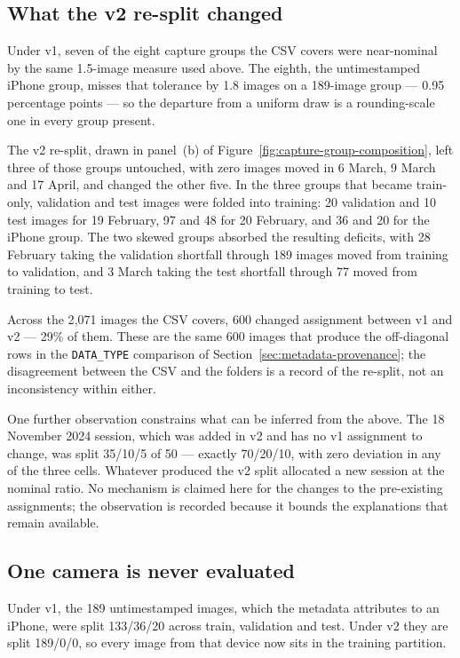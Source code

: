 \subsection{What the v2 re-split changed}
\label{sec:v2-resplit}

Under v1, seven of the eight capture groups the CSV covers were near-nominal by
the same 1.5-image measure used above. The eighth, the untimestamped iPhone
group, misses that tolerance by 1.8 images on a 189-image group --- 0.95
percentage points --- so the departure from a uniform draw is a rounding-scale
one in every group present.

The v2 re-split, drawn in panel~(b) of
Figure~\ref{fig:capture-group-composition}, left three of those groups untouched,
with zero images moved in 6 March, 9 March and 17 April, and changed the other
five. In the three groups that
became train-only, validation and test images were folded into training: 20
validation and 10 test images for 19 February, 97 and 48 for 20 February, and 36
and 20 for the iPhone group. The two skewed groups absorbed the resulting
deficits, with 28 February taking the validation shortfall through 189 images
moved from training to validation, and 3 March taking the test shortfall through
77 moved from training to test.

Across the 2{,}071 images the CSV covers, 600 changed assignment between v1 and
v2 --- 29\% of them. These are the same 600 images that produce the off-diagonal
rows in the \texttt{DATA\_TYPE} comparison of
Section~\ref{sec:metadata-provenance}; the disagreement between the CSV and the
folders is a record of the re-split, not an inconsistency within either.

One further observation constrains what can be inferred from the above. The 18
November 2024 session, which was added in v2 and has no v1 assignment to change,
was split 35/10/5 of 50 --- exactly 70/20/10, with zero deviation in any of the
three cells. Whatever produced the v2 split allocated a new session at the
nominal ratio. No mechanism is claimed here for the changes to the pre-existing
assignments; the observation is recorded because it bounds the explanations that
remain available.

\subsection{One camera is never evaluated}
\label{sec:camera-coverage}

Under v1, the 189 untimestamped images, which the metadata attributes to an
iPhone, were split 133\slash 36\slash 20 across train, validation and test. Under
v2 they are split 189\slash 0\slash 0, so every image from that device now sits
in the training partition.

